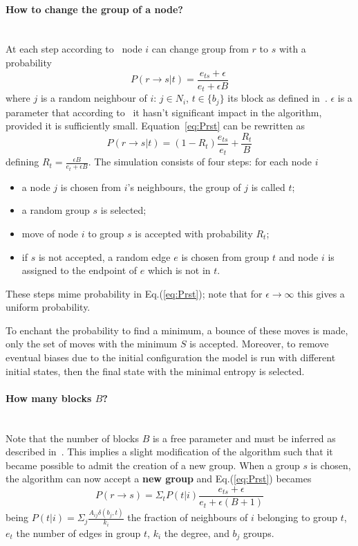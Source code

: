 \paragraph{How to change the group of a node?}\mbox{}\\
At each step according to~\cite{peixoto2014efficient} node $i$ can change group from $r$ to $s$ with a probability
\begin{equation}\label{eq:Prst}
  P(r\to s|t)=\frac{e_{ts}+\epsilon}{e_t+\epsilon B}
\end{equation}
where $j$ is a random neighbour of $i$: $j\in N_i$, $t\in\{b_j\}$ its block as defined in~\cite{peixoto2014efficient}. $\epsilon$ is a parameter that according to~\cite{peixoto2017nonparametric} it hasn't significant impact in the algorithm, provided it is sufficiently small.
Equation~\ref{eq:Prst} can be rewritten as \[P(r\to s|t)=(1-R_t)\frac{e_{ts}}{e_t}+\frac{R_t}{B}\] defining $R_t=\frac{\epsilon B}{e_t + \epsilon B}$.
The simulation consists of four steps: for each node $i$
\begin{itemize}
  \item a node $j$ is chosen from $i$'s neighbours, the group of $j$ is called $t$;
  \item a random group $s$ is selected;
  \item move of node $i$ to group $s$ is accepted with probability $R_t$;
  \item if $s$ is not accepted, a random edge $e$ is chosen from group $t$ and node $i$ is assigned to the endpoint of $e$ which is not in $t$.
\end{itemize}
These steps mime probability in Eq.(\ref{eq:Prst}); note that for $\epsilon\to\infty$ this gives a uniform probability.

To enchant the probability to find a minimum, a bounce of these moves is made, only the set of moves with the minimum $S$ is accepted. Moreover, to remove eventual biases due to the initial configuration the model is run with different initial states, then the final state with the minimal entropy is selected.

\paragraph{How many blocks $B$?}\mbox{}\\
Note that the number of blocks $B$ is a free parameter and must be inferred as described in~\cite{peixoto2017nonparametric}. This implies a slight modification of the algorithm such that it became possible to admit the creation of  a new group.
When a group $s$ is chosen, the algorithm can now accept a \textbf{new group} and Eq.(\ref{eq:Prst}) becames
\begin{equation}\label{eq:PrstB1}
  P(r\to s)=\Sigma_t P(t|i)\frac{e_{ts}+\epsilon}{e_t+\epsilon (B+1)}
\end{equation}
being $P(t|i)=\Sigma_j\frac{A_{ij}\delta(b_j, t)}{k_i}$ the fraction of neighbours of $i$ belonging to group $t$, $e_t$ the number of edges in group $t$,
$k_i$ the degree, and $b_j$ groups.


